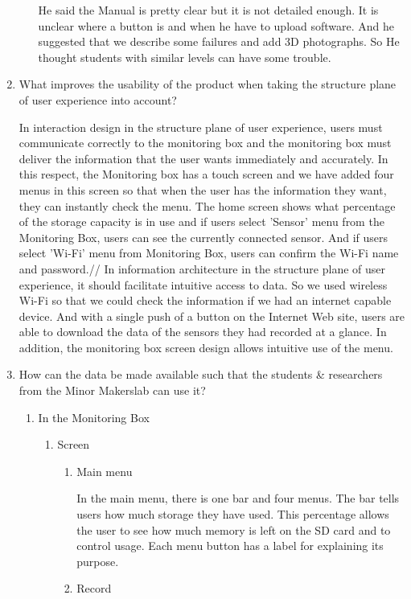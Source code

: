 \documentclass[conference]{IEEEtran}
\begin{document}
\begin{enumerate}
\begin{enumerate}
He said the Manual is pretty clear but it is not detailed enough. It is unclear where a button is and when he have to upload software. And he suggested that we describe some failures and add 3D photographs. So He thought students with similar levels can have some trouble. 
\end{enumerate}

 
\item What improves the usability of the product when taking the structure plane of user experience into account?

In interaction design in the structure plane of user experience, users must communicate correctly to the monitoring box and the monitoring box must deliver the information that the user wants immediately and accurately. In this respect, the Monitoring box has a touch screen and we have added four menus in this screen so that when the user has the information they want, they can instantly check the menu. The home screen shows what percentage of the storage capacity is in use and if users select 'Sensor' menu from the Monitoring Box, users can see the currently connected sensor. And if users select 'Wi-Fi' menu from Monitoring Box, users can confirm the Wi-Fi name and password.//
In information architecture in the structure plane of user experience, it should facilitate intuitive access to data. So we used wireless Wi-Fi so that we could check the information if we had an internet capable device. And with a single push of a button on the Internet Web site, users are able to download the data of the sensors they had recorded at a glance. In addition, the monitoring box screen design allows intuitive use of the menu.
\\

\item How can the data be made available such that the students \& researchers from the Minor Makerslab can use it?
\begin{enumerate}
\item In the Monitoring Box
\begin{enumerate}
\item Screen
\begin{enumerate}
\item Main menu

 In the main menu, there is one bar and four menus. The bar tells users how much storage they have used. This percentage allows the user to see how much memory is left on the SD card and to control usage. Each menu button has a label for explaining its purpose.\\
\item Record


\end{enumerate}
\end{enumerate}
\end{enumerate}
\end{enumerate}
\end{document}
